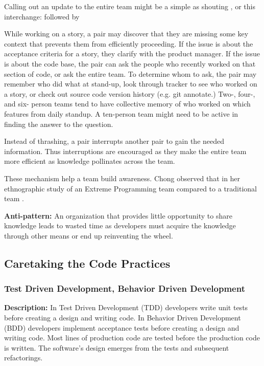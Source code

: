 \begin{table}[]
Calling out an update to the entire team might be a simple as shouting , or this interchange:   followed by 

While working on a story, a pair may discover that they are missing some key context that prevents them from efficiently proceeding. If the issue is about the acceptance criteria for a story, they clarify with the product manager. If the issue is about the code base, the pair can ask the people who recently worked on that section of code, or ask the entire team.  To determine whom to ask, the pair may remember who did what at stand-up, look through tracker to see who worked on a story, or check out source code version history (e.g. git annotate.) Two-, four-, and six- person teams tend to have collective memory of who worked on which features from daily standup. A ten-person team might need to be active in finding the answer to the question. 

Instead of thrashing, a pair interrupts another pair to gain the needed information. Thus interruptions are encouraged as they make the entire team more efficient as knowledge pollinates across the team. 

These mechanism help a team build awareness. Chong observed that  in her ethnographic study of an Extreme Programming team compared to a traditional team \cite{ChongNominum}.
 
\textbf{Anti-pattern:} An organization that provides little opportunity to share knowledge leads to wasted time as developers must acquire the knowledge through other means or end up reinventing the wheel.
\subsection{Caretaking the Code Practices}
\subsubsection{Test Driven Development, Behavior Driven Development}
\textbf{Description:} In Test Driven Development (TDD) developers write unit tests before creating a design and writing code. In Behavior Driven Development (BDD) developers implement acceptance tests before creating a design and writing code. Most lines of production code are tested before the production code is written. The software's design emerges from the tests and subsequent refactorings.


\end{table}
